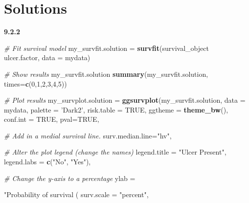 \documentclass[]{book}
\makeatletter
\newenvironment{Shaded}{\begin{snugshade}}{\end{snugshade}}
\newcommand{\CommentTok}[1]{\textcolor[rgb]{0.56,0.35,0.01}{\textit{#1}}}
\newcommand{\DataTypeTok}[1]{\textcolor[rgb]{0.13,0.29,0.53}{#1}}
\newcommand{\DecValTok}[1]{\textcolor[rgb]{0.00,0.00,0.81}{#1}}
\newcommand{\KeywordTok}[1]{\textcolor[rgb]{0.13,0.29,0.53}{\textbf{#1}}}
\newcommand{\NormalTok}[1]{#1}
\newcommand{\OperatorTok}[1]{\textcolor[rgb]{0.81,0.36,0.00}{\textbf{#1}}}
\newcommand{\OtherTok}[1]{\textcolor[rgb]{0.56,0.35,0.01}{#1}}
\newcommand{\StringTok}[1]{\textcolor[rgb]{0.31,0.60,0.02}{#1}}
\newenvironment{kframe}{%
\medskip{}
\setlength{\fboxsep}{.8em}
 \def\at@end@of@kframe{}%
 \ifinner\ifhmode%
  \def\at@end@of@kframe{\end{minipage}}%
  \begin{minipage}{\columnwidth}%
 \fi\fi%
 \def\FrameCommand##1{\hskip\@totalleftmargin \hskip-\fboxsep
 \colorbox{shadecolor}{##1}\hskip-\fboxsep
     \hskip-\linewidth \hskip-\@totalleftmargin \hskip\columnwidth}%
 \MakeFramed {\advance\hsize-\width
   \@totalleftmargin\z@ \linewidth\hsize
   \@setminipage}}%
 {\par\unskip\endMakeFramed%
 \at@end@of@kframe}
\renewenvironment{Shaded}{\begin{kframe}}{\end{kframe}}
\theoremstyle{definition}
\theoremstyle{definition}
\theoremstyle{definition}
\theoremstyle{remark}
\makeatother
\begin{document}
\hypertarget{solutions-5}{%
\section{Solutions}\label{solutions-5}}

\textbf{9.2.2}

\begin{Shaded}
\begin{Highlighting}[]
\CommentTok{# Fit survival model}
\NormalTok{my_survfit.solution =}\StringTok{ }\KeywordTok{survfit}\NormalTok{(survival_object }\OperatorTok{~}\StringTok{ }\NormalTok{ulcer.factor, }\DataTypeTok{data =}\NormalTok{ mydata)}

\CommentTok{# Show results}
\NormalTok{my_survfit.solution}
\KeywordTok{summary}\NormalTok{(my_survfit.solution, }\DataTypeTok{times=}\KeywordTok{c}\NormalTok{(}\DecValTok{0}\NormalTok{,}\DecValTok{1}\NormalTok{,}\DecValTok{2}\NormalTok{,}\DecValTok{3}\NormalTok{,}\DecValTok{4}\NormalTok{,}\DecValTok{5}\NormalTok{))}

\CommentTok{# Plot results}
\NormalTok{my_survplot.solution =}\StringTok{ }\KeywordTok{ggsurvplot}\NormalTok{(my_survfit.solution,}
                         \DataTypeTok{data =}\NormalTok{ mydata,}
                         \DataTypeTok{palette =} \StringTok{'Dark2'}\NormalTok{,}
                         \DataTypeTok{risk.table =} \OtherTok{TRUE}\NormalTok{,}
                         \DataTypeTok{ggtheme =} \KeywordTok{theme_bw}\NormalTok{(),}
                         \DataTypeTok{conf.int =} \OtherTok{TRUE}\NormalTok{,}
                         \DataTypeTok{pval=}\OtherTok{TRUE}\NormalTok{,}
                         
                         \CommentTok{# Add in a medial survival line.}
                         \DataTypeTok{surv.median.line=}\StringTok{"hv"}\NormalTok{,}

                         \CommentTok{# Alter the plot legend (change the names)}
                         \DataTypeTok{legend.title =} \StringTok{"Ulcer Present"}\NormalTok{, }
                         \DataTypeTok{legend.labs =} \KeywordTok{c}\NormalTok{(}\StringTok{"No"}\NormalTok{, }\StringTok{"Yes"}\NormalTok{),}
                        
                         \CommentTok{# Change the y-axis to a percentage}
                         \DataTypeTok{ylab =} \StringTok{"Probability of survival (%
                         \DataTypeTok{surv.scale =} \StringTok{"percent"}\NormalTok{,}

}
\end{Highlighting}
\end{Shaded}
\end{document}
